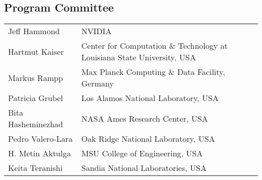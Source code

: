 \documentclass{llncs}
\begin{document}

\subsection*{Program Committee}
\begin{tabular}{@{}p{5cm}@{}p{7.2cm}@{}}
Jeff Hammond & NVIDIA \\
Hartmut Kaiser & Center for Computation \& Technology at Louisiana State University, USA \\
Markus Rampp & Max Planck Computing \& Data Facility, Germany \\
Patricia Grubel & Los Alamos National Laboratory, USA \\
Bita Hasheminezhad & NASA Ames Research Center, USA \\
Pedro Valero-Lara & Oak Ridge National Laboratory, USA
\\
H. Metin Aktulga & MSU College of Engineering, USA
\\
Keita Teranishi & Sandia National Laboratories, USA
\end{tabular}
\end{document}
